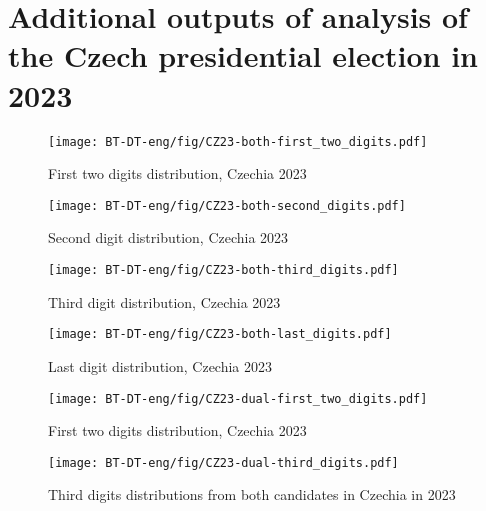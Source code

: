 \chapter{Additional outputs of analysis of the Czech presidential election in 2023}


\begin{figure}[h]
    \centering
    \caption{First two digits distribution, Czechia 2023}
    \texttt{[image: BT-DT-eng/fig/CZ23-both-first\_two\_digits.pdf]}
    \label{fig:CZ23-both-first_two_digits}
\end{figure}

\begin{figure}[h]
    \centering
    \caption{Second digit distribution, Czechia 2023}
    \texttt{[image: BT-DT-eng/fig/CZ23-both-second\_digits.pdf]}
    \label{fig:CZ23-both-second_digits}
\end{figure}

\begin{figure}[h]
    \centering
    \caption{Third digit distribution, Czechia 2023}
    \texttt{[image: BT-DT-eng/fig/CZ23-both-third\_digits.pdf]}
    \label{fig:CZ23-both-third_digits}
\end{figure}

\begin{figure}[h]
    \centering
    \caption{Last digit distribution, Czechia 2023}
    \texttt{[image: BT-DT-eng/fig/CZ23-both-last\_digits.pdf]}
    \label{fig:CZ23-both-last_digits}
\end{figure}

\begin{figure}[h]
    \centering
    \caption{First two digits distribution, Czechia 2023}
    \texttt{[image: BT-DT-eng/fig/CZ23-dual-first\_two\_digits.pdf]}
    \label{fig:CZ23-dual-first_two_digits}
\end{figure}

\begin{figure}[h]
    \centering
    \caption{Third digits distributions from both candidates in Czechia in 2023}
    \texttt{[image: BT-DT-eng/fig/CZ23-dual-third\_digits.pdf]}
    \label{fig:CZ23-dual-third_digits}
\end{figure}







